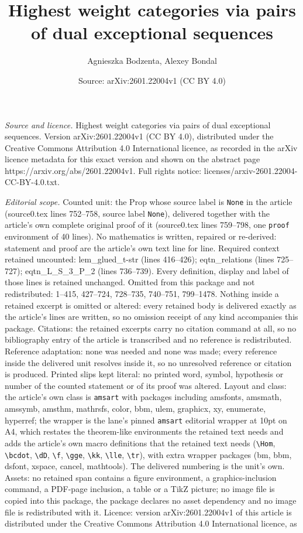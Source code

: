 \documentclass[10pt,a4paper]{amsart}
\title[Highest weight categories via pairs of dual exceptional sequ]{Highest weight categories via pairs of dual exceptional sequences}
\author{Agnieszka Bodzenta, Alexey Bondal}
\date{Source: arXiv:2601.22004v1 (CC BY 4.0)}
\begin{document}
\maketitle

\noindent\emph{Source and licence.} Highest weight categories via pairs of dual exceptional sequences. Version arXiv:2601.22004v1 (CC BY 4.0), distributed under the Creative Commons Attribution 4.0 International licence, as recorded in the arXiv licence metadata for this exact version and shown on the abstract page https://arxiv.org/abs/2601.22004v1. Full rights notice: licenses/arxiv-2601.22004-CC-BY-4.0.txt.\par\smallskip

\noindent\textit{Editorial scope.} Counted unit: the Prop whose source label is \texttt{None} in the article (source0.tex lines 752--758, source label \texttt{None}), delivered together with the article's own complete original proof of it (source0.tex lines 759--798, one \texttt{proof} environment of 40 lines). No mathematics is written, repaired or re-derived: statement and proof are the article's own text line for line. Required context retained uncounted: lem\_glued\_t-str (lines 416--426); eqtn\_relations (lines 725--727); eqtn\_L\_S\_3\_P\_2 (lines 736--739). Every definition, display and label of those lines is retained unchanged. Omitted from this package and not redistributed: 1--415, 427--724, 728--735, 740--751, 799--1478. Nothing inside a retained excerpt is omitted or altered: every retained body is delivered exactly as the article's lines are written, so no omission receipt of any kind accompanies this package. Citations: the retained excerpts carry no citation command at all, so no bibliography entry of the article is transcribed and no reference is redistributed. Reference adaptation: none was needed and none was made; every reference inside the delivered unit resolves inside it, so no unresolved reference or citation is produced. Printed slips kept literal: no printed word, symbol, hypothesis or number of the counted statement or of its proof was altered. Layout and class: the article's own class is \texttt{amsart} with packages including amsfonts, amsmath, amssymb, amsthm, mathrsfs, color, bbm, ulem, graphicx, xy, enumerate, hyperref; the wrapper is the lane's pinned \texttt{amsart} editorial wrapper at 10pt on A4, which restates the theorem-like environments the retained text needs and adds the article's own macro definitions that the retained text needs (\texttt{\textbackslash Hom}, \texttt{\textbackslash bcdot}, \texttt{\textbackslash dD}, \texttt{\textbackslash f}, \texttt{\textbackslash gge}, \texttt{\textbackslash kk}, \texttt{\textbackslash lle}, \texttt{\textbackslash tr}), with extra wrapper packages (bm, bbm, dsfont, xspace, cancel, mathtools). The delivered numbering is the unit's own. Assets: no retained span contains a figure environment, a graphics-inclusion command, a PDF-page inclusion, a table or a TikZ picture; no image file is copied into this package, the package declares no asset dependency and no image file is redistributed with it. Licence: version arXiv:2601.22004v1 of this article is distributed under the Creative Commons Attribution 4.0 International licence, as 
\end{document}

